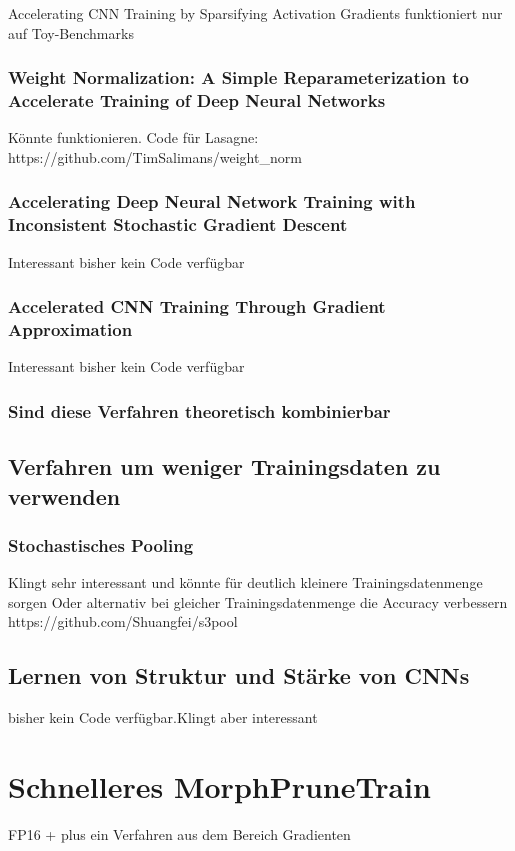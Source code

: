 Accelerating CNN Training by Sparsifying Activation Gradients funktioniert nur auf Toy-Benchmarks 


\subsubsection{Weight Normalization: A Simple Reparameterization
to Accelerate Training of Deep Neural Networks}

Könnte funktionieren. Code für Lasagne: https://github.com/TimSalimans/weight\_norm


\subsubsection{Accelerating Deep Neural Network Training with Inconsistent Stochastic Gradient Descent}

Interessant bisher kein Code verfügbar

\subsubsection{Accelerated CNN Training Through Gradient Approximation }

Interessant bisher kein Code verfügbar


\subsubsection{Sind diese Verfahren theoretisch kombinierbar}
\subsection{Verfahren um weniger Trainingsdaten zu verwenden}


\subsubsection{Stochastisches Pooling}

Klingt sehr interessant und könnte für deutlich kleinere Trainingsdatenmenge sorgen
Oder alternativ bei gleicher Trainingsdatenmenge die Accuracy verbessern
https://github.com/Shuangfei/s3pool

\subsection{Lernen von Struktur und Stärke von CNNs}

bisher kein Code verfügbar.Klingt aber interessant




\section{Schnelleres MorphPruneTrain}
FP16 + plus ein Verfahren aus dem Bereich Gradienten


